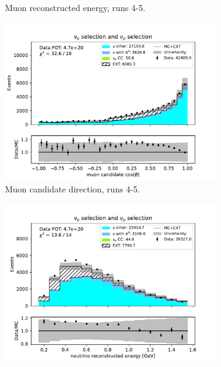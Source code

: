 \begin{figure}[H]
\begin{subfigure}{0.33\linewidth}
        \caption{Muon reconstructed energy, runs 4-5.}
    \end{subfigure}%
    \begin{subfigure}{0.33\linewidth}
        \captionsetup{width=0.6\linewidth}
        \includegraphics[width=\linewidth]{technote/Sidebands/Figures/NuMuSideband/muon_sideband_muon_theta_run4a4b4c4d5_NUMU_NUMU.pdf}
        \caption{Muon candidate direction, runs 4-5.}
    \end{subfigure}%
    \begin{subfigure}{0.33\linewidth}
        \captionsetup{width=0.7\linewidth}
        \includegraphics[width=\linewidth]{technote/Sidebands/Figures/NuMuSideband/muon_sideband_neutrino_energy_run4a4b4c4d5_NUMU_NUMU.pdf}

\end{subfigure}
\end{figure}
